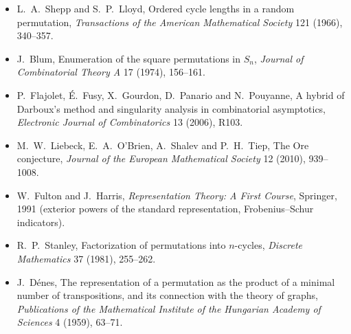 \begin{itemize}
\item L.~A.~Shepp and S.~P.~Lloyd, Ordered cycle lengths in a random permutation, \emph{Transactions of the American Mathematical
Society} 121 (1966), 340--357.
\item J.~Blum, Enumeration of the square permutations in $S_n$, \emph{Journal of Combinatorial Theory A} 17 (1974), 156--161.
\item P.~Flajolet, É.~Fusy, X.~Gourdon, D.~Panario and N.~Pouyanne, A hybrid of Darboux's method and singularity analysis in
combinatorial asymptotics, \emph{Electronic Journal of Combinatorics} 13 (2006), R103.
\item M.~W.~Liebeck, E.~A.~O'Brien, A.~Shalev and P.~H.~Tiep, The Ore conjecture, \emph{Journal of the European Mathematical
Society} 12 (2010), 939--1008.
\item W.~Fulton and J.~Harris, \emph{Representation Theory: A First Course}, Springer, 1991 (exterior powers of the standard
representation, Frobenius--Schur indicators).
\item R.~P.~Stanley, Factorization of permutations into $n$-cycles, \emph{Discrete Mathematics} 37 (1981), 255--262.
\item J.~Dénes, The representation of a permutation as the product of a minimal number of transpositions, and its connection
with the theory of graphs, \emph{Publications of the Mathematical Institute of the Hungarian Academy of Sciences} 4 (1959), 63--71.
\end{itemize}
